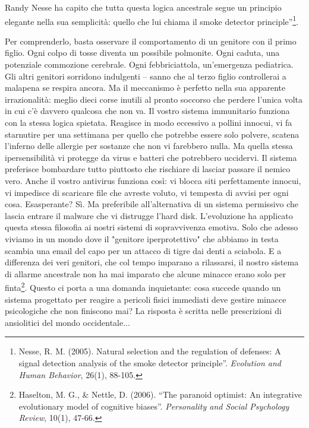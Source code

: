 Randy Nesse ha capito che tutta questa logica ancestrale segue un principio elegante nella sua semplicità: quello che lui chiama il smoke detector principle''\footnote{Nesse, R. M. (2005). Natural selection and the regulation of defenses: A signal detection analysis of the smoke detector principle''. \textit{Evolution and Human Behavior}, 26(1), 88-105.}.

Per comprenderlo, basta osservare il comportamento di un genitore con il primo figlio.
Ogni colpo di tosse diventa un possibile polmonite. Ogni caduta, una potenziale commozione cerebrale. Ogni febbriciattola, un'emergenza pediatrica. Gli altri genitori sorridono indulgenti -- sanno che al terzo figlio controllerai a malapena se respira ancora. Ma il meccanismo è perfetto nella sua apparente irrazionalità: meglio dieci corse inutili al pronto soccorso che perdere l'unica volta in cui c'è davvero qualcosa che non va.
Il vostro sistema immunitario funziona con la stessa logica spietata. Reagisce in modo eccessivo a pollini innocui, vi fa starnutire per una settimana per quello che potrebbe essere solo polvere, scatena l'inferno delle allergie per sostanze che non vi farebbero nulla. Ma quella stessa ipersensibilità vi protegge da virus e batteri che potrebbero uccidervi. Il sistema preferisce bombardare tutto piuttosto che rischiare di lasciar passare il nemico vero.
Anche il vostro antivirus funziona così: vi blocca siti perfettamente innocui, vi impedisce di scaricare file che avreste voluto, vi tempesta di avvisi per ogni cosa. Esasperante? Sì. Ma preferibile all'alternativa di un sistema permissivo che lascia entrare il malware che vi distrugge l'hard disk.
L'evoluzione ha applicato questa stessa filosofia ai nostri sistemi di sopravvivenza emotiva. Solo che adesso viviamo in un mondo dove il "genitore iperprotettivo" che abbiamo in testa scambia una email del capo per un attacco di tigre dai denti a sciabola. E a differenza dei veri genitori, che col tempo imparano a rilassarsi, il nostro sistema di allarme ancestrale non ha mai imparato che alcune minacce erano solo per finta\footnote{Haselton, M. G., & Nettle, D. (2006). ``The paranoid optimist: An integrative evolutionary model of cognitive biases''. \textit{Personality and Social Psychology Review}, 10(1), 47-66.}.
Questo ci porta a una domanda inquietante: cosa succede quando un sistema progettato per reagire a pericoli fisici immediati deve gestire minacce psicologiche che non finiscono mai? La risposta è scritta nelle prescrizioni di ansiolitici del mondo occidentale...

